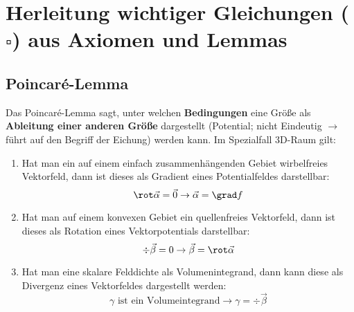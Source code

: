 \section{Herleitung wichtiger Gleichungen ($\square$) aus Axiomen und Lemmas}
 \subsection{Poincaré-Lemma} \label{poin}
	   Das Poincaré-Lemma sagt, unter welchen \textbf{Bedingungen} eine Größe
	        als \textbf{Ableitung einer anderen Größe} dargestellt (Potential; nicht
	        Eindeutig $\to$ führt auf den Begriff der Eichung) werden kann. Im Spezialfall 3D-Raum gilt:
	        \begin{enumerate}
		        \item Hat man ein auf einem einfach zusammenhängenden Gebiet wirbelfreies Vektorfeld, dann ist dieses als Gradient eines Potentialfeldes darstellbar:
		              \begin{equation}\label{poin1}
			              \rot\vec{\alpha}=\vec{0}\to \vec{\alpha}= \grad f
		              \end{equation}
		        \item Hat man auf einem konvexen Gebiet ein quellenfreies Vektorfeld, dann ist dieses als Rotation eines Vektorpotentials darstellbar:
		              \begin{equation}\label{poin2}
			              \div \vec{\beta}=0 \to \vec{\beta}= \rot\vec{\alpha}
		              \end{equation}
		        \item Hat man eine skalare Felddichte als Volumenintegrand, dann kann diese als Divergenz eines Vektorfeldes dargestellt werden:
		              \begin{equation}\label{poin3}
			              \gamma \text{ ist ein Volumeintegrand}\to \gamma = \div \vec{\beta}
		              \end{equation}
	        \end{enumerate}
	        

